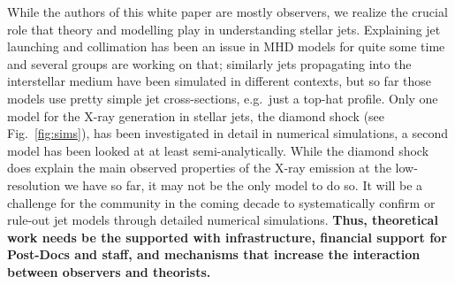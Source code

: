\documentclass[12pt]{article}
\begin{document}
While the authors of this white paper are mostly observers, we realize the
crucial role that theory and modelling play in understanding stellar
jets. Explaining jet launching and collimation has been an issue in MHD models
for quite some time and several groups are working on that; similarly jets
propagating into the interstellar medium have been simulated in different
contexts, but so far those models use pretty simple jet cross-sections,
e.g.\ just a top-hat profile. Only one model for the X-ray generation in
stellar jets, the diamond shock (see Fig.~\ref{fig:sims}), has been
investigated in detail in numerical simulations, a second model has been looked at at least semi-analytically. While the diamond shock does explain the main observed properties of the X-ray emission at the low-resolution we have so far, it may not be the only model to do so. It will be a challenge for the community in the coming decade to systematically confirm or rule-out jet models through detailed numerical simulations. \textbf{Thus, theoretical work needs be the supported with infrastructure, financial support for Post-Docs and staff, and mechanisms that increase the interaction between observers and theorists.}

\pagebreak


\end{document}
